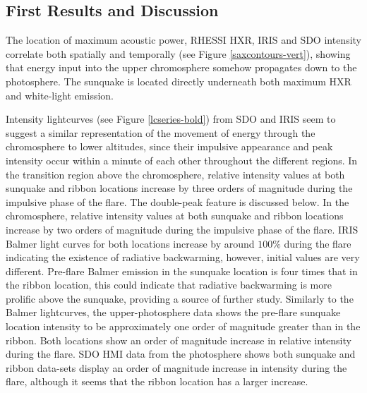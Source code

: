 \subsection{First Results and Discussion}
The location of maximum acoustic power, RHESSI HXR, IRIS and SDO intensity correlate both spatially and temporally (see Figure \ref{saxcontours-vert}), showing that energy input into the upper chromosphere somehow propagates down to the photosphere. The sunquake is located directly underneath both maximum HXR and white-light emission. 

Intensity lightcurves (see Figure \ref{lcseries-bold}) from SDO and IRIS seem to suggest a similar representation of the movement of energy through the chromosphere to lower altitudes, since their impulsive appearance and peak intensity occur within a minute of each other throughout the different regions. In the transition region above the chromosphere, relative intensity values at both sunquake and ribbon locations increase by three orders of magnitude during the impulsive phase of the flare. The double-peak feature is discussed below. In the chromosphere, relative intensity values at both sunquake and ribbon locations increase by two orders of magnitude during the impulsive phase of the flare. IRIS Balmer light curves for both locations increase by around $100\%$ during the flare indicating the existence of radiative backwarming, however, initial values are very different. Pre-flare Balmer emission in the sunquake location is four times that in the ribbon location, this could indicate that radiative backwarming is more prolific above the sunquake, providing a source of further study. Similarly to the Balmer lightcurves, the upper-photosphere data shows the pre-flare sunquake location intensity to be approximately one order of magnitude greater than in the ribbon. Both locations show an order of magnitude increase in relative intensity during the flare. SDO HMI data from the photosphere shows both sunquake and ribbon data-sets display an order of magnitude increase in intensity during the flare, although it seems that the ribbon location has a larger increase.      




